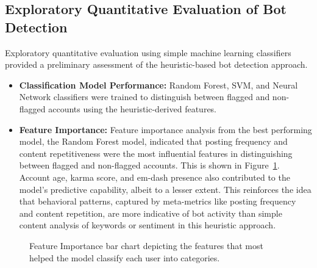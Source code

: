 \documentclass[
  12pt,
  letterpaper,
  DIV=11,
  numbers=noendperiod,
  abstract]{scrartcl}
\begin{document}
\subsection{Exploratory Quantitative Evaluation of Bot
Detection}\label{exploratory-quantitative-evaluation-of-bot-detection}

Exploratory quantitative evaluation using simple machine learning
classifiers provided a preliminary assessment of the heuristic-based bot
detection approach.

\begin{itemize}
\item
  \textbf{Classification Model Performance:} Random Forest, SVM, and
  Neural Network classifiers were trained to distinguish between flagged
  and non-flagged accounts using the heuristic-derived features.
\item
  \textbf{Feature Importance:} Feature importance analysis from the best
  performing model, the Random Forest model, indicated that posting
  frequency and content repetitiveness were the most influential
  features in distinguishing between flagged and non-flagged accounts.
  This is shown in Figure~\ref{fig-importance}. Account age, karma
  score, and em-dash presence also contributed to the model's predictive
  capability, albeit to a lesser extent. This reinforces the idea that
  behavioral patterns, captured by meta-metrics like posting frequency
  and content repetition, are more indicative of bot activity than
  simple content analysis of keywords or sentiment in this heuristic
  approach.
\end{itemize}

\begin{figure}


\caption{\label{fig-importance}Feature Importance bar chart depicting
the features that most helped the model classify each user into
categories.}

\end{figure}%
\end{document}
